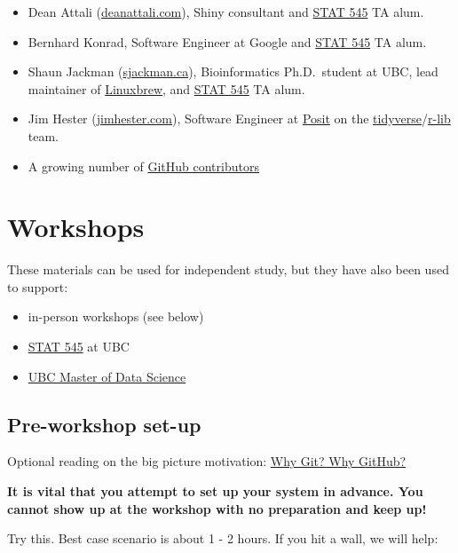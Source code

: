 \documentclass[
]{book}
\providecommand{\tightlist}{%
  \setlength{\itemsep}{0pt}\setlength{\parskip}{0pt}}
\begin{document}
\begin{itemize}
\tightlist
\item
  Dean Attali (\href{http://deanattali.com}{deanattali.com}), Shiny consultant and \href{http://stat545.com}{STAT 545} TA alum.
\item
  Bernhard Konrad, Software Engineer at Google and \href{http://stat545.com}{STAT 545} TA alum.
\item
  Shaun Jackman (\href{http://sjackman.ca}{sjackman.ca}), Bioinformatics Ph.D.~student at UBC, lead maintainer of \href{http://linuxbrew.sh}{Linuxbrew}, and \href{http://stat545.com}{STAT 545} TA alum.
\item
  Jim Hester (\href{https://www.jimhester.com}{jimhester.com}), Software Engineer at \href{https://posit.co/}{Posit} on the \href{https://www.tidyverse.org}{tidyverse}/\href{https://github.com/r-lib/}{r-lib} team.
\item
  A growing number of \href{https://github.com/jennybc/happy-git-with-r/graphs/contributors}{GitHub contributors}
\end{itemize}

\chapter{Workshops}\label{workshops}

These materials can be used for independent study, but they have also been used to support:

\begin{itemize}
\tightlist
\item
  in-person workshops (see below)
\item
  \href{http://stat545.com}{STAT 545} at UBC
\item
  \href{http://masterdatascience.science.ubc.ca}{UBC Master of Data Science}
\end{itemize}

\section{Pre-workshop set-up}\label{pre-workshop-set-up}

Optional reading on the big picture motivation: \hyperref[big-picture]{Why Git? Why GitHub?}

\textbf{It is vital that you attempt to set up your system in advance. You cannot show up at the workshop with no preparation and keep up!}

Try this. Best case scenario is about 1 - 2 hours. If you hit a wall, we will help:
\end{document}
